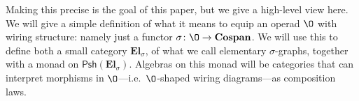 \documentclass[11pt, article, oneside]{memoir}
\theoremstyle{plain}
\theoremstyle{definition}
\theoremstyle{remark}
\newcommand{\Cat}[1]{\mathbf{#1}}
\newcommand{\Fun}[1]{\mathsf{#1}}
\DeclareMathOperator{\id}{id}
\newcommand{\Psh}{\Fun{Psh}}
\newcommand{\Cospan}{\Cat{Cospan}}
\newcommand{\stodo}[2][]{\todo[color=red!30, #1]{#2}}
\newcommand\El{\Cat{El}}
\newcommand\stick{\shortmid}
\begin{document}
Making this precise is the goal of this paper, but we give a high-level view here. We will give a simple definition of what it means to equip an operad $\O$ with wiring structure: namely just a functor $\sigma\colon\O\to\Cospan$. We will use this to define both a small category $\El_\sigma$, of what we call elementary $\sigma$-graphs, together with a monad on $\Psh(\El_\sigma)$. Algebras on this monad will be categories that can interpret morphisms in $\O$---i.e.\ $\O$-shaped wiring diagrams---as composition laws.


%
 

%
%
%
%
\end{document}
